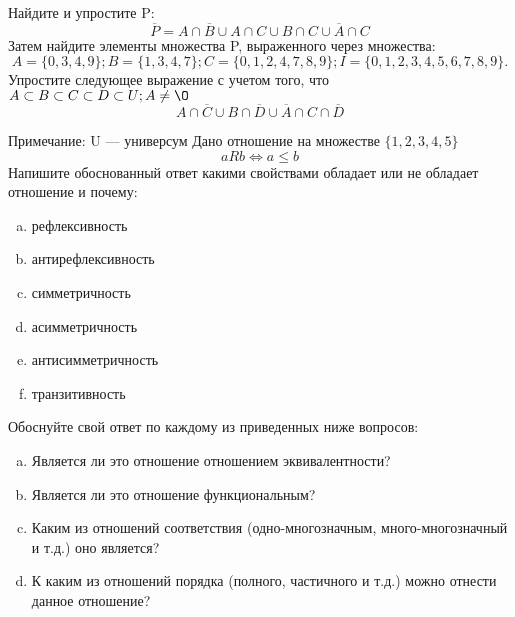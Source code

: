 \documentclass[10pt]{exam}
\begin{document}
\begin{questions}
\question
Найдите и упростите P:
\begin{equation*}
\overline{P} = A \cap \overline{B} \cup A \cap C \cup B \cap C \cup \overline{A} \cap C
\end{equation*}
Затем найдите элементы множества P, выраженного через множества:
\begin{equation*}
A = \{0, 3, 4, 9\}; 
B = \{1, 3, 4, 7\};
C = \{0, 1, 2, 4, 7, 8, 9\};
I = \{0, 1, 2, 3, 4, 5, 6, 7, 8, 9\}.
\end{equation*}\question
Упростите следующее выражение с учетом того, что $A\subset B \subset C \subset D \subset U; A \neq \O$
\begin{equation*}
A \cap  \overline{C} \cup B \cap \overline{D} \cup  \overline{A} \cap C \cap  \overline{D}
\end{equation*}

Примечание: U — универсум\question
Дано отношение на множестве $\{1, 2, 3, 4, 5\}$ 
\begin{equation*}
aRb \iff a \leq b
\end{equation*}
Напишите обоснованный ответ какими свойствами обладает или не обладает отношение и почему:   
\begin{enumerate} [a)]\setcounter{enumi}{0}
\item рефлексивность
\item антирефлексивность
\item симметричность
\item асимметричность
\item антисимметричность
\item транзитивность
\end{enumerate}

Обоснуйте свой ответ по каждому из приведенных ниже вопросов:
\begin{enumerate} [a)]\setcounter{enumi}{0}
    \item Является ли это отношение отношением эквивалентности?
    \item Является ли это отношение функциональным?
    \item Каким из отношений соответствия (одно-многозначным, много-многозначный и т.д.) оно является?
    \item К каким из отношений порядка (полного, частичного и т.д.) можно отнести данное отношение?
\end{enumerate}



\end{questions}
\end{document}
